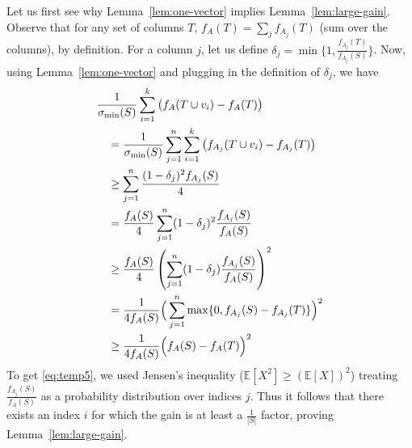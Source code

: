 \documentclass{article}
\begin{document}
Let us first see why Lemma~\ref{lem:one-vector} implies Lemma~\ref{lem:large-gain}. Observe that for any set of columns $T$, $f_A (T) = \sum_{j} f_{A_j} (T)$ (sum over the columns), by definition. For a column $j$, let us define $\delta_j = \min \{ 1, \frac{f_{A_j}(T)}{f_{A_j}(S)}\}$. Now, using Lemma~\ref{lem:one-vector} and plugging in the definition of $\delta_j$, we have
\begin{align}
  & \frac{1}{\sigma_{\min}(S)} \sum_{i=1}^k  \big( f_A(T \cup v_i) - f_A(T) \big) \label{eq:start}\\
  & \quad =  \frac{1}{\sigma_{\min}(S)} \sum_{j = 1}^n \sum_{i=1}^k \big( f_{A_j}(T \cup v_i) - f_{A_j}(T) \big) \notag\\
& \quad \geq \sum_{j=1}^n \frac{ (1-\delta_j)^2 f_{A_j}(S)}{4} \label{eq:temp3}\\
& \quad = \frac{f_A(S)}{4} \sum_{j=1}^n (1 - \delta_j)^2 \frac{f_{A_j}(S)}{f_A(S)} \label{eq:temp4}\\ 
& \quad \geq \frac{f_A(S)}{4} \left( \sum_{j=1}^n (1 - \delta_j) \frac{f_{A_j}(S)}{f_A(S)}\right)^2 \label{eq:temp5} \\ 
& \quad = \frac{1}{4 f_A(S)} \Big(\sum_{j=1}^n \max\{ 0, f_{A_j}(S) - f_{A_j}(T) \}\Big)^2 \label{eq:temp6} \\
& \quad \ge \frac{1}{4 f_A(S)} \Big(f_A(S) - f_A(T) \Big)^2 \label{eq:temp8}
\end{align}
To get \eqref{eq:temp5}, we used Jensen's inequality ($\mathbb{E}[X^2] \geq ( \mathbb{E}[X])^2$) treating $\frac{f_{A_j}(S)}{f_{A}(S)}$ as a probability distribution over indices $j$. Thus it follows that there exists an index $i$ for which the gain is at least a $\frac{1}{|S|}$ factor, proving Lemma~\ref{lem:large-gain}.
\end{document}
